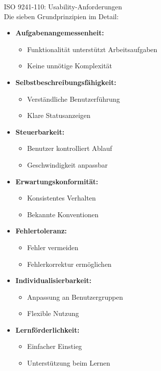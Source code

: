 \begin{theorem}{ISO 9241-110: Usability-Anforderungen}\\
Die sieben Grundprinzipien im Detail:

\begin{itemize}
    \item \textbf{Aufgabenangemessenheit:}
    \begin{itemize}
        \item Funktionalität unterstützt Arbeitsaufgaben
        \item Keine unnötige Komplexität
    \end{itemize}
    
    \item \textbf{Selbstbeschreibungsfähigkeit:}
    \begin{itemize}
        \item Verständliche Benutzerführung
        \item Klare Statusanzeigen
    \end{itemize}
    
    \item \textbf{Steuerbarkeit:}
    \begin{itemize}
        \item Benutzer kontrolliert Ablauf
        \item Geschwindigkeit anpassbar
    \end{itemize}
    
    \item \textbf{Erwartungskonformität:}
    \begin{itemize}
        \item Konsistentes Verhalten
        \item Bekannte Konventionen
    \end{itemize}
    
    \item \textbf{Fehlertoleranz:}
    \begin{itemize}
        \item Fehler vermeiden
        \item Fehlerkorrektur ermöglichen
    \end{itemize}
    
    \item \textbf{Individualisierbarkeit:}
    \begin{itemize}
        \item Anpassung an Benutzergruppen
        \item Flexible Nutzung
    \end{itemize}
    
    \item \textbf{Lernförderlichkeit:}
    \begin{itemize}
        \item Einfacher Einstieg
        \item Unterstützung beim Lernen
    \end{itemize}
\end{itemize}
\end{theorem}

